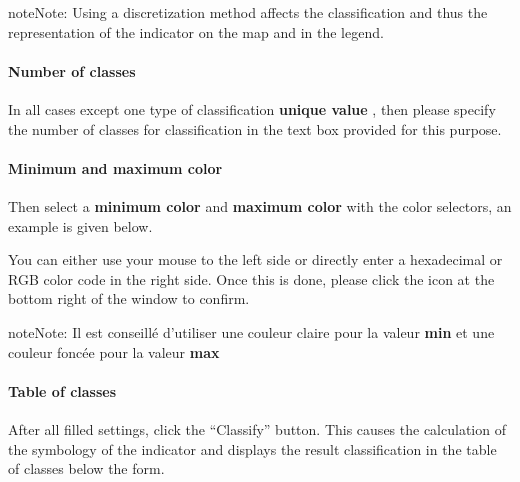 \documentclass[letterpaper,10pt,english]{sphinxmanual}
\begin{document}
\begin{notice}{note}{Note:}
Using a discretization method affects the classification and thus the representation of the indicator on the map and in the legend.
\end{notice}
\paragraph{Number of classes}

In all cases except one type of classification \textbf{unique value} , then please specify the number of classes for classification in the text box provided for this purpose.
\paragraph{Minimum and maximum color}

Then select a \textbf{minimum color} and \textbf{maximum color} with the color selectors, an example is given below.


You can either use your mouse to the left side or directly enter a hexadecimal or RGB color code in the right side. Once this is done, please click the icon at the bottom right of the window to confirm.

\begin{notice}{note}{Note:}
Il est conseillé d'utiliser une couleur claire pour la valeur \textbf{min} et une couleur foncée pour la valeur \textbf{max}
\end{notice}
\paragraph{Table of classes}

After all filled settings, click the ``Classify'' button. This causes the calculation of the symbology of the indicator and displays the result classification in the table of classes below the form.
\end{document}

